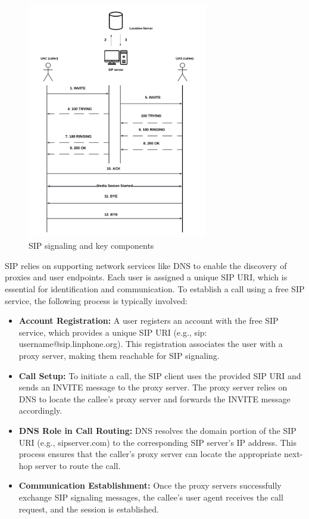     \begin{figure}[H]
        \centering
        \includegraphics[width=0.7\textwidth]{image/Call Initiation.pdf} 
        \caption{SIP signaling and key components}
        \label{fig:sip_signaling}
    \end{figure}
    
    SIP relies on supporting network services like DNS to enable the discovery of proxies and user endpoints. 
    Each user is assigned a unique SIP URI, which is essential for identification and communication. 
    To establish a call using a free SIP service, the following process is typically involved:

    \begin{itemize}
        \item \textbf{Account Registration:} A user registers an account with the free SIP service, which provides a unique SIP URI (e.g., sip: username@sip.linphone.org). 
        This registration associates the user with a proxy server, making them reachable for SIP signaling.
        \item \textbf{Call Setup:} To initiate a call, the SIP client uses the provided SIP URI and sends an INVITE message to the proxy server. 
        The proxy server relies on DNS to locate the callee's proxy server and forwards the INVITE message accordingly.
        \item \textbf{DNS Role in Call Routing:} DNS resolves the domain portion of the SIP URI (e.g., sipserver.com) to the corresponding SIP server's IP address. 
        This process ensures that the caller's proxy server can locate the appropriate next-hop server to route the call.
        \item \textbf{Communication Establishment:}  Once the proxy servers successfully exchange SIP signaling messages, the callee's user agent receives the call request, and the session is established.
    \end{itemize}
    

